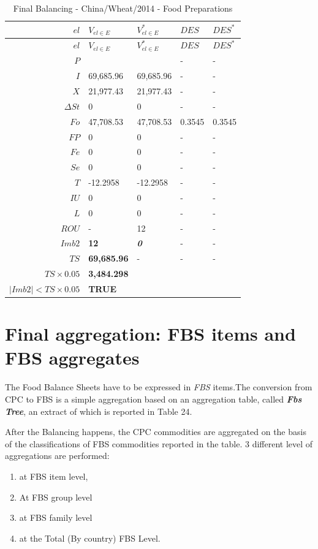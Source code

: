 \documentclass[]{article}
\providecommand{\tightlist}{%
  \setlength{\itemsep}{0pt}\setlength{\parskip}{0pt}}
\begin{document}
\begin{longtable}[]{@{}rllll@{}}
\caption{Final Balancing - China/Wheat/2014 - Food
Preparations}\tabularnewline
\toprule
\boldmath\(el\) & \boldmath\(V_{el \in E}\) &
\boldmath\(V^*_{el \in E}\) & \boldmath\(DES\) &
\boldmath\(DES^*\)\tabularnewline
\midrule
\endfirsthead
\toprule
\boldmath\(el\) & \boldmath\(V_{el \in E}\) &
\boldmath\(V^*_{el \in E}\) & \boldmath\(DES\) &
\boldmath\(DES^*\)\tabularnewline
\midrule
\endhead
\(P\) & & & - & -\tabularnewline
\(I\) & 69,685.96 & 69,685.96 & - & -\tabularnewline
\(X\) & 21,977.43 & 21,977.43 & - & -\tabularnewline
\(\Delta St\) & 0 & 0 & - & -\tabularnewline
\(Fo\) & 47,708.53 & 47,708.53 & 0.3545 & 0.3545\tabularnewline
\(FP\) & 0 & 0 & - & -\tabularnewline
\(Fe\) & 0 & 0 & - & -\tabularnewline
\(Se\) & 0 & 0 & - & -\tabularnewline
\(T\) & -12.2958 & -12.2958 & - & -\tabularnewline
\(IU\) & 0 & 0 & - & -\tabularnewline
\(L\) & 0 & 0 & - & -\tabularnewline
\(ROU\) & - & 12 & - & -\tabularnewline
\boldmath\(Imb2\) & \textbf{12} & \textbf{\emph{0}} & - &
-\tabularnewline
\boldmath\(TS\) & \textbf{69,685.96} & - & - & -\tabularnewline
\boldmath\(TS \times 0.05\) & \textbf{3,484.298} & & &\tabularnewline
\boldmath\(|Imb2| < TS \times 0.05\) & \textbf{TRUE} & &
&\tabularnewline
\bottomrule
\end{longtable}

\section{Final aggregation: FBS items and FBS
aggregates}\label{final-aggregation-fbs-items-and-fbs-aggregates}

The Food Balance Sheets have to be expressed in \emph{FBS} items.The
conversion from CPC to FBS is a simple aggregation based on an
aggregation table, called \textbf{\emph{Fbs Tree}}, an extract of which
is reported in Table 24.

After the Balancing happens, the CPC commodities are aggregated on the
basis of the classifications of FBS commodities reported in the table. 3
different level of aggregations are performed:

\begin{enumerate}
\def\labelenumi{\arabic{enumi}.}
\tightlist
\item
  at FBS item level,
\item
  At FBS group level
\item
  at FBS family level
\item
  at the Total (By country) FBS Level.
\end{enumerate}
\end{document}
